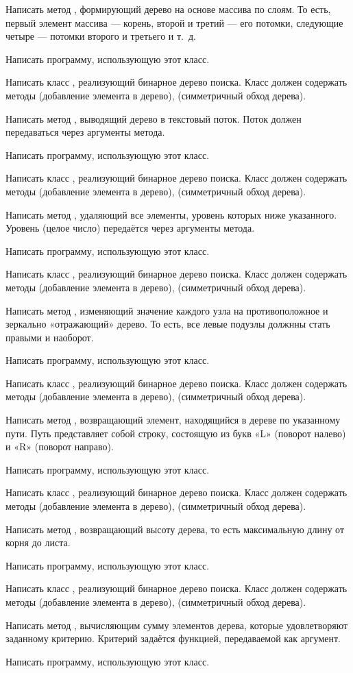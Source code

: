 Написать метод , формирующий дерево на основе массива
по слоям. То есть, первый элемент массива — корень, второй и третий —
его потомки, следующие четыре — потомки второго и третьего и т.~д.

Написать программу, использующую этот класс.

\task Написать класс , реализующий бинарное дерево
поиска. Класс должен содержать методы  (добавление элемента в
дерево),  (симметричный обход дерева).

Написать метод , выводящий дерево в текстовый поток. Поток
должен передаваться через аргументы метода.

Написать программу, использующую этот класс.

\task Написать класс , реализующий бинарное дерево
поиска. Класс должен содержать методы  (добавление элемента в
дерево),  (симметричный обход дерева).

Написать метод , удаляющий все элементы, уровень которых
ниже указанного. Уровень (целое число) передаётся через аргументы
метода.

Написать программу, использующую этот класс.

\task Написать класс , реализующий бинарное дерево
поиска. Класс должен содержать методы  (добавление элемента в
дерево),  (симметричный обход дерева).

Написать метод , изменяющий значение каждого узла на
противоположное и зеркально «отражающий» дерево. То есть, все
левые подузлы должнны стать правыми и наоборот.

Написать программу, использующую этот класс.

\task Написать класс , реализующий бинарное дерево
поиска. Класс должен содержать методы  (добавление элемента в
дерево),  (симметричный обход дерева).

Написать метод , возвращающий элемент, находящийся в
дереве по указанному пути. Путь представляет собой
строку, состоящую из букв «L» (поворот налево) и «R» (поворот
направо).

Написать программу, использующую этот класс.

\task Написать класс , реализующий бинарное дерево
поиска. Класс должен содержать методы  (добавление элемента в
дерево),  (симметричный обход дерева).

Написать метод , возвращающий высоту дерева, то есть
максимальную длину от корня до листа.

Написать программу, использующую этот класс.

\task Написать класс , реализующий бинарное дерево
поиска. Класс должен содержать методы  (добавление элемента в
дерево),  (симметричный обход дерева).

Написать метод , вычисляющим сумму элементов дерева, которые
удовлетворяют заданному критерию. Критерий задаётся функцией,
передаваемой как аргумент.

Написать программу, использующую этот класс.